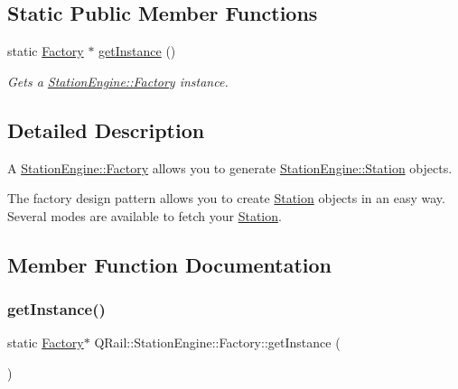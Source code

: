 \subsection*{Static Public Member Functions}
\begin{DoxyCompactItemize}
\item 
static \mbox{\hyperlink{classQRail_1_1StationEngine_1_1Factory}{Factory}} $\ast$ \mbox{\hyperlink{classQRail_1_1StationEngine_1_1Factory_ac66b314d8a7787511a6677a24ab321ff}{get\+Instance}} ()
\begin{DoxyCompactList}\small\item\em Gets a \mbox{\hyperlink{classQRail_1_1StationEngine_1_1Factory}{Station\+Engine\+::\+Factory}} instance. \end{DoxyCompactList}\end{DoxyCompactItemize}


\subsection{Detailed Description}
A \mbox{\hyperlink{classQRail_1_1StationEngine_1_1Factory}{Station\+Engine\+::\+Factory}} allows you to generate \mbox{\hyperlink{classQRail_1_1StationEngine_1_1Station}{Station\+Engine\+::\+Station}} objects. 

The factory design pattern allows you to create \mbox{\hyperlink{classQRail_1_1StationEngine_1_1Station}{Station}} objects in an easy way. Several modes are available to fetch your \mbox{\hyperlink{classQRail_1_1StationEngine_1_1Station}{Station}}. 

\subsection{Member Function Documentation}
\mbox{\label{classQRail_1_1StationEngine_1_1Factory_ac66b314d8a7787511a6677a24ab321ff}} 
\subsubsection{\texorpdfstring{getInstance()}{getInstance()}}
{\footnotesize\ttfamily static \mbox{\hyperlink{classQRail_1_1StationEngine_1_1Factory}{Factory}}$\ast$ Q\+Rail\+::\+Station\+Engine\+::\+Factory\+::get\+Instance (\begin{DoxyParamCaption}{ }\end{DoxyParamCaption})\hspace{0.3cm}{\ttfamily [static]}}



